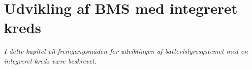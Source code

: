 \chapter{Udvikling af BMS med integreret kreds}\label{kap:udvikling_integreret}

\emph{I dette kapitel vil fremgangsmåden for udviklingen af batteristyresystemet med en integreret kreds være beskrevet.}